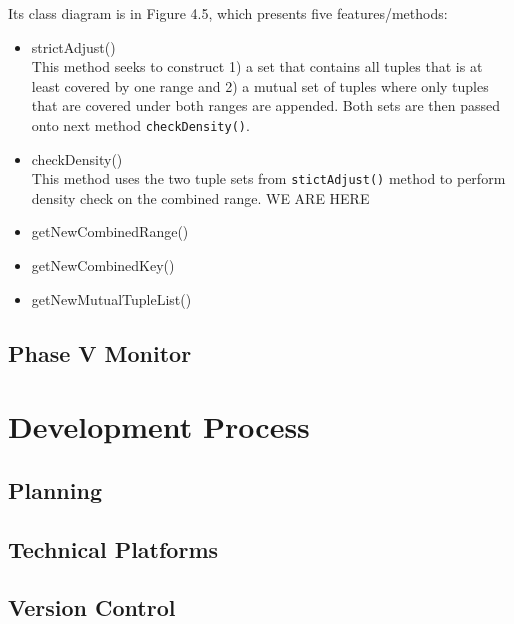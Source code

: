\begin{description}
Its class diagram is in Figure 4.5, which presents five features/methods:

\begin{itemize}
	\item{strictAdjust()} \\
 	This method seeks to construct 1) a set that contains all tuples that is at least covered by one range and 2) a mutual set of tuples where only tuples that are covered under both ranges are appended. Both sets are then passed onto next method \texttt{checkDensity()}.
	
	\item{checkDensity()} \\
	This method uses the two tuple sets from \texttt{stictAdjust()} method to perform density check on the combined range. 
	WE ARE HERE
	
	\item{getNewCombinedRange()} \\

	

	
	\item{getNewCombinedKey()} \\

	 
	
	\item{getNewMutualTupleList()} \\

	
\end{itemize}

\end{description}

\subsection{Phase V Monitor}

\section{Development Process}

\subsection{Planning}
\subsection{Technical Platforms}
\subsection{Version Control}





